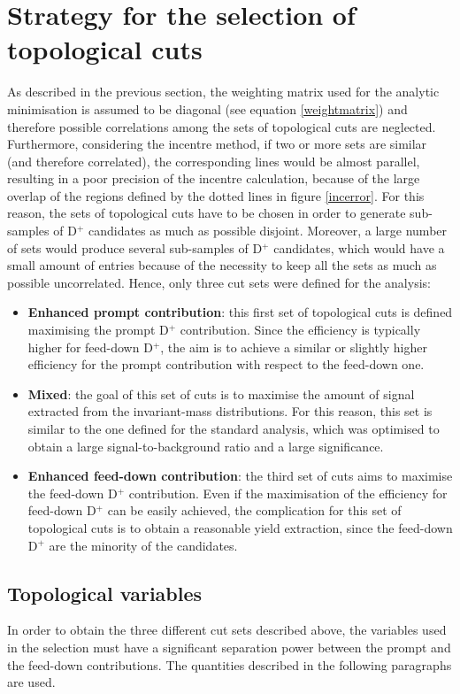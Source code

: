 \documentclass[b5paper,10pt,twoside,oldstyle,classica]{toptesi}
\begin{document}
\section{Strategy for the selection of topological cuts}
\label{cutvar_strategy}
As described in the previous section, the weighting matrix used for the analytic minimisation is assumed to be diagonal (see equation \ref{weightmatrix}) and therefore possible correlations among the sets of topological cuts are neglected. Furthermore, considering the incentre method, if two or more sets are similar (and therefore correlated), the corresponding lines would be almost parallel, resulting in a poor precision of the incentre calculation, because of the large overlap of the regions defined by the dotted lines in figure \ref{incerror}. For this reason, the sets of topological cuts have to be chosen in order to generate sub-samples of D$^+$ candidates as much as possible disjoint. Moreover, a large number of sets would produce several sub-samples of D$^+$ candidates, which would have a small amount of entries because of the necessity to keep all the sets as much as possible uncorrelated. Hence, only three cut sets were defined for the analysis:
\begin{itemize}
\item \textbf{Enhanced prompt contribution}: this first set of topological cuts is defined maximising the prompt D$^+$ contribution. Since the efficiency is typically higher for feed-down D$^+$, the aim is to achieve a similar or slightly higher efficiency for the prompt contribution with respect to the feed-down one.  
\item \textbf{Mixed}: the goal of this set of cuts is to maximise the amount of signal extracted from the invariant-mass distributions. For this reason, this set is similar to the one defined for the standard analysis, which was optimised to obtain a large signal-to-background ratio and a large significance. 
\item \textbf{Enhanced feed-down contribution}: the third set of cuts aims to maximise the feed-down D$^+$ contribution. Even if the maximisation of the efficiency for feed-down D$^+$ can be easily achieved, the complication for this set of topological cuts is to obtain a reasonable yield extraction, since the feed-down D$^+$ are the minority of the candidates. 
\end{itemize}
\subsection{Topological variables}
In order to obtain the three different cut sets described above, the variables used in the selection must have a significant separation power between the prompt and the feed-down contributions. The quantities described in the following paragraphs are used.
\end{document}
